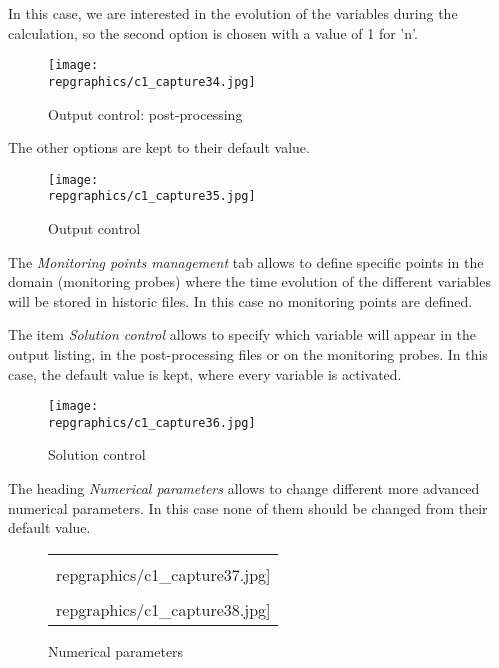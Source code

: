 In this case, we are interested in the evolution of the variables during the
calculation, so the second option is chosen with a value of 1 for 'n'.

\begin{figure}[ht]
\begin{center}
\texttt{[image: \\repgraphics/c1\_capture34.jpg]}
\caption{Output control: post-processing}
\label{fig34_e1}
\end{center}
\end{figure}


\clearpage
The other options are kept to their default value.

\begin{figure}[ht]
\begin{center}
\texttt{[image: \\repgraphics/c1\_capture35.jpg]}
\caption{Output control}
\label{fig35_e1}
\end{center}
\end{figure}

The {\itshape Monitoring points management} tab allows to define specific points
in the domain (monitoring probes) where the time evolution of the different
variables will be stored in historic files. In this case no monitoring points
are defined.


\clearpage
The item {\itshape Solution control} allows to specify which variable will
appear in the output listing, in the post-processing files or on the
monitoring probes. In this case, the default value is kept, where every variable
is activated.


\begin{figure}[ht]
\begin{center}
\texttt{[image: \\repgraphics/c1\_capture36.jpg]}
\caption{Solution control}
\label{fig36_e1}
\end{center}
\end{figure}


\clearpage
The heading {\itshape Numerical parameters} allows to change different more
advanced numerical parameters. In this case none of them should be changed from
their default value.

\begin{figure}[!h]
\begin{center}
\begin{tabular}{c}
\texttt{[image: \\repgraphics/c1\_capture37.jpg]}\\
\texttt{[image: \\repgraphics/c1\_capture38.jpg]}
\end{tabular}
\caption{Numerical parameters}
\label{fig3738_e1}
\end{center}
\end{figure}


